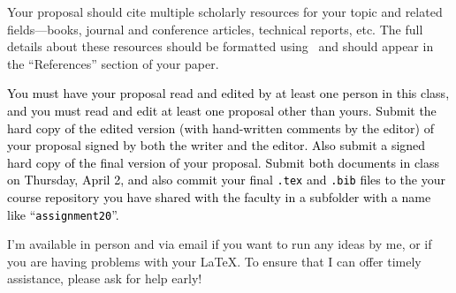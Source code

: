 Your proposal should cite multiple scholarly resources for your topic and related fields---books, journal and conference
articles, technical reports, etc. The full details about these resources should be formatted using \BibTeX\ and should
appear in the ``References'' section of your paper.

\textcolor{black}{You must have your proposal read and edited by at least one person in this class, and you must read
  and edit at least one proposal other than yours.  Submit the hard copy of the edited version (with hand-written
  comments by the editor) of your proposal signed by both the writer and the editor.  Also submit a signed hard copy of
  the final version of your proposal.  Submit both documents in class on Thursday, April 2, and also commit your final
{\tt .tex} and {\tt .bib} files to the your course repository you have shared with the faculty in a subfolder with a
name like ``{\tt assignment20}''.}

I'm available in person and via email if you want to run any ideas by me, or if you are having problems with your
\LaTeX. To ensure that I can offer timely assistance, please ask for help early!


